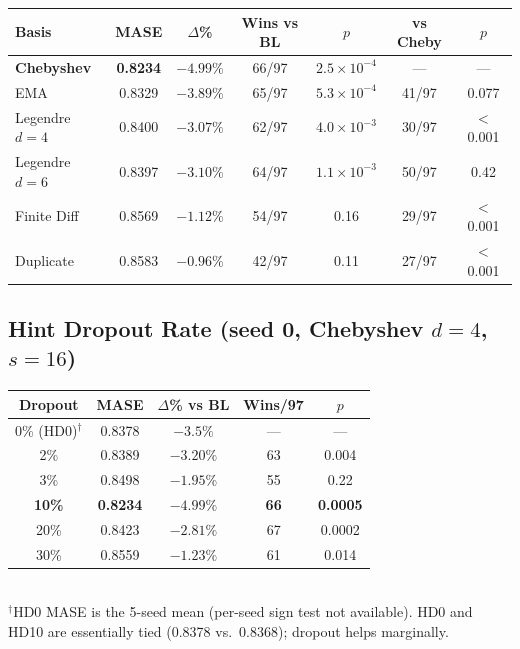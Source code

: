 \documentclass[11pt]{article}
\begin{document}
\begin{table}[h]
\centering
\small
\begin{tabular}{lcccccc}
\toprule
\textbf{Basis} & \textbf{MASE} & \textbf{$\Delta$\%} & \textbf{Wins vs BL} & \textbf{$p$} & \textbf{vs Cheby} & \textbf{$p$} \\
\midrule
\textbf{Chebyshev} & \textbf{0.8234} & $-4.99\%$ & 66/97 & $2.5 \times 10^{-4}$ & --- & --- \\
EMA & 0.8329 & $-3.89\%$ & 65/97 & $5.3 \times 10^{-4}$ & 41/97 & 0.077 \\
Legendre $d=4$ & 0.8400 & $-3.07\%$ & 62/97 & $4.0 \times 10^{-3}$ & 30/97 & $<$0.001 \\
Legendre $d=6$ & 0.8397 & $-3.10\%$ & 64/97 & $1.1 \times 10^{-3}$ & 50/97 & 0.42 \\
Finite Diff & 0.8569 & $-1.12\%$ & 54/97 & 0.16 & 29/97 & $<$0.001 \\
Duplicate & 0.8583 & $-0.96\%$ & 42/97 & 0.11 & 27/97 & $<$0.001 \\
\bottomrule
\end{tabular}
\end{table}

\subsection{Hint Dropout Rate (seed 0, Chebyshev $d=4$, $s=16$)}

\begin{table}[h]
\centering
\small
\begin{tabular}{ccccc}
\toprule
\textbf{Dropout} & \textbf{MASE} & \textbf{$\Delta$\% vs BL} & \textbf{Wins/97} & \textbf{$p$} \\
\midrule
0\% (HD0)$^\dagger$ & 0.8378 & $-3.5\%$ & --- & --- \\
2\% & 0.8389 & $-3.20\%$ & 63 & 0.004 \\
3\% & 0.8498 & $-1.95\%$ & 55 & 0.22 \\
\textbf{10\%} & \textbf{0.8234} & $\mathbf{-4.99\%}$ & \textbf{66} & \textbf{0.0005} \\
20\% & 0.8423 & $-2.81\%$ & 67 & 0.0002 \\
30\% & 0.8559 & $-1.23\%$ & 61 & 0.014 \\
\bottomrule
\end{tabular}
\\[2pt]
{\footnotesize $^\dagger$HD0 MASE is the 5-seed mean (per-seed sign test not available). HD0 and HD10 are essentially tied (0.8378 vs.\ 0.8368); dropout helps marginally.}
\end{table}
\end{document}
